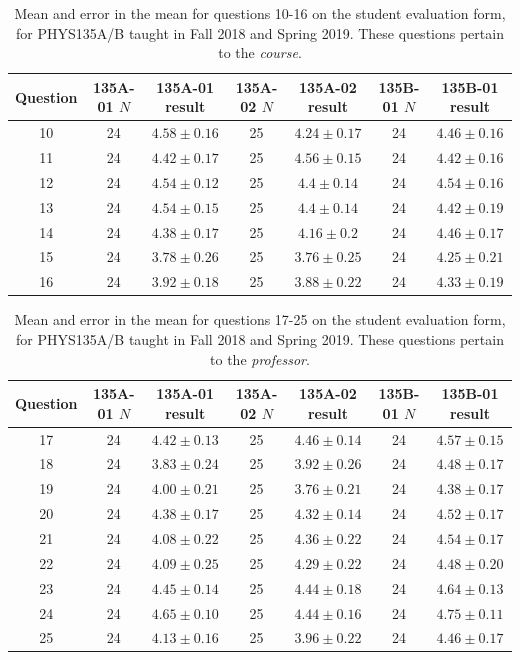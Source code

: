 \documentclass[../../main.tex]{subfiles}
\begin{document}
\begin{table}
\small
\centering
\begin{tabular}{| c | c | c | c | c | c | c |}
\hline \hline
Question & 135A-01 $N$ & 135A-01 result & 135A-02 $N$ & 135A-02 result & 135B-01 $N$ & 135B-01 result \\ \hline
10 & 24 & $4.58\pm 0.16$ & 25 & $4.24\pm 0.17$ & 24 & $4.46\pm 0.16$ \\ \hline
11 & 24 & $4.42\pm 0.17$ & 25 & $4.56\pm 0.15$ & 24 & $4.42\pm 0.16$ \\ \hline
12 & 24 & $4.54\pm 0.12$ & 25 & $4.4\pm 0.14$ & 24 & $4.54\pm 0.16$ \\ \hline
13 & 24 & $4.54\pm 0.15$ & 25 & $4.4\pm 0.14$ & 24 & $4.42\pm 0.19$ \\ \hline
14 & 24 & $4.38\pm 0.17$ & 25 & $4.16\pm 0.2$ & 24 & $4.46\pm 0.17$ \\ \hline
15 & 24 & $3.78\pm 0.26$ & 25 & $3.76\pm 0.25$ & 24 & $4.25\pm 0.21$ \\ \hline
16 & 24 & $3.92\pm 0.18$ & 25 & $3.88\pm 0.22$ & 24 & $4.33\pm 0.19$ \\ \hline
\hline
\end{tabular}
\caption{\label{tab:courses:intro_eval_1} Mean and error in the mean for questions 10-16 on the student evaluation form, for PHYS135A/B taught in Fall 2018 and Spring 2019.  These questions pertain to the \textit{course}.}
\end{table}

\begin{table}
\small
\centering
\begin{tabular}{| c | c | c | c | c | c | c |}
\hline \hline
Question & 135A-01 $N$ & 135A-01 result & 135A-02 $N$ & 135A-02 result & 135B-01 $N$ & 135B-01 result \\ \hline
17 & 24 & $4.42\pm 0.13$ & 25 & $4.46\pm 0.14$ & 24 & $4.57\pm 0.15$ \\ \hline
18 & 24 & $3.83\pm 0.24$ & 25 & $3.92\pm 0.26$ & 24 & $4.48\pm 0.17$ \\ \hline
19 & 24 & $4.00\pm 0.21$ & 25 & $3.76\pm 0.21$ & 24 & $4.38\pm 0.17$ \\ \hline
20 & 24 & $4.38\pm 0.17$ & 25 & $4.32\pm 0.14$ & 24 & $4.52\pm 0.17$ \\ \hline
21 & 24 & $4.08\pm 0.22$ & 25 & $4.36\pm 0.22$ & 24 & $4.54\pm 0.17$ \\ \hline
22 & 24 & $4.09\pm 0.25$ & 25 & $4.29\pm 0.22$ & 24 & $4.48\pm 0.20$ \\ \hline
23 & 24 & $4.45\pm 0.14$ & 25 & $4.44\pm 0.18$ & 24 & $4.64\pm 0.13$ \\ \hline
24 & 24 & $4.65\pm 0.10$ & 25 & $4.44\pm 0.16$ & 24 & $4.75\pm 0.11$ \\ \hline
25 & 24 & $4.13\pm 0.16$ & 25 & $3.96\pm 0.22$ & 24 & $4.46\pm 0.17$ \\ \hline
\hline
\end{tabular}
\caption{\label{tab:courses:intro_eval_2} Mean and error in the mean for questions 17-25 on the student evaluation form, for PHYS135A/B taught in Fall 2018 and Spring 2019.  These questions pertain to the \textit{professor}.}
\end{table}
\end{document}
